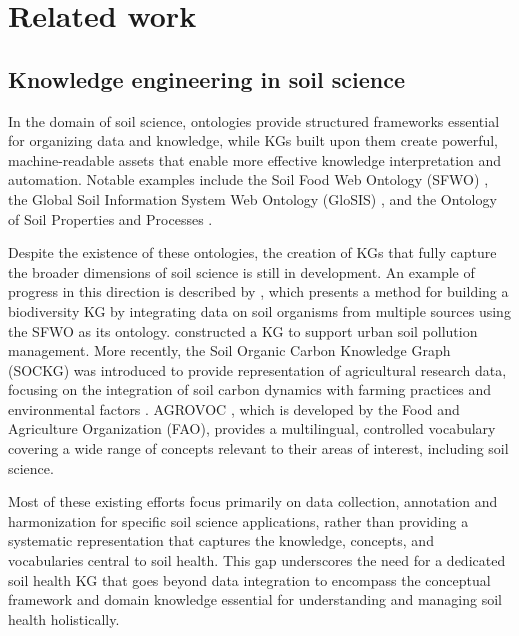 \documentclass[preprint,12pt]{elsarticle}
\begin{document}
\section{Related work} \label{sec2}
\subsection{Knowledge engineering in soil science}\label{sec2_1}
In the domain of soil science, ontologies provide structured frameworks essential for organizing data and knowledge, while KGs built upon them create powerful, machine-readable assets that enable more effective knowledge interpretation and automation. Notable examples include the Soil Food Web Ontology (SFWO) \citep{LEGUILLARME2023102360}, the Global Soil Information System Web Ontology (GloSIS) \citep{doi:10.1177/22104968251363767}, and the Ontology of Soil Properties and Processes \citep{10.1007/978-3-319-46547-0_4}.

Despite the existence of these ontologies, the creation of KGs that fully capture the broader dimensions of soil science is still in development. An example of progress in this direction is described by \citet{LEGUILLARME2023103497}, which presents a method for building a biodiversity KG by integrating data on soil organisms from multiple sources using the SFWO as its ontology. \citet{HAN2022115685} constructed a KG to support urban soil pollution management. More recently, the Soil Organic Carbon Knowledge Graph (SOCKG) was introduced to provide representation of agricultural research data, focusing on the integration of soil carbon dynamics with farming practices and environmental factors \citep{10.1007/978-3-031-97207-2_18}. AGROVOC \citep{SUBIRATSCOLL2022105965}, which is developed by the Food and Agriculture Organization (FAO), provides a multilingual, controlled vocabulary covering a wide range of concepts relevant to their areas of interest, including soil science.

Most of these existing efforts focus primarily on data collection, annotation and harmonization for specific soil science applications, rather than providing a systematic representation that captures the knowledge, concepts, and vocabularies central to soil health. This gap underscores the need for a dedicated soil health KG that goes beyond data integration to encompass the conceptual framework and domain knowledge essential for understanding and managing soil health holistically.
\end{document}
